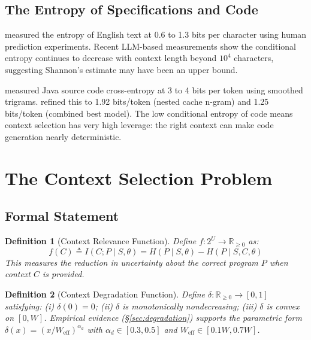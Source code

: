 \documentclass[11pt, a4paper, logo, copyright]{googledeepmind}
\newtheorem{definition}{Definition}[section]
\begin{document}
\subsection{The Entropy of Specifications and Code}

\citet{shannon1951prediction} measured the entropy of English text at 0.6 to 1.3 bits per character using human prediction experiments. Recent LLM-based measurements \citep{bialek2025entropy} show the conditional entropy continues to decrease with context length beyond $10^4$ characters, suggesting Shannon's estimate may have been an upper bound.

\citet{hindle2012naturalness} measured Java source code cross-entropy at 3 to 4 bits per token using smoothed trigrams. \citet{hellendoorn2017deep} refined this to 1.92 bits/token (nested cache n-gram) and 1.25 bits/token (combined best model). The low conditional entropy of code means context selection has very high leverage: the right context can make code generation nearly deterministic.


\section{The Context Selection Problem}
\label{sec:context-selection}

\subsection{Formal Statement}

\begin{definition}[Context Relevance Function]
\label{def:relevance}
Define $f: 2^U \to \mathbb{R}_{\geq 0}$ as:
$$f(C) \triangleq I(C; P \mid S, \theta) = H(P \mid S, \theta) - H(P \mid S, C, \theta)$$
This measures the reduction in uncertainty about the correct program $P$ when context $C$ is provided.
\end{definition}

\begin{definition}[Context Degradation Function]
\label{def:degradation}
Define $\delta: \mathbb{R}_{\geq 0} \to [0, 1]$ satisfying: (i) $\delta(0) = 0$; (ii) $\delta$ is monotonically nondecreasing; (iii) $\delta$ is convex on $[0, W]$. Empirical evidence (\S\ref{sec:degradation}) supports the parametric form $\delta(x) = (x/W_{\text{eff}})^{\alpha_d}$ with $\alpha_d \in [0.3, 0.5]$ and $W_{\text{eff}} \in [0.1W, 0.7W]$.
\end{definition}
\end{document}
